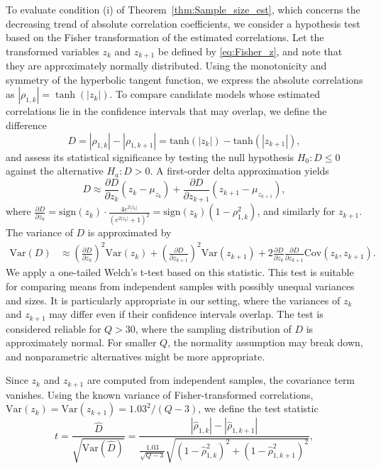 To evaluate condition (i) of Theorem~\ref{thm:Sample_size_est}, which concerns the decreasing trend of absolute correlation coefficients, we consider a hypothesis test based on the Fisher transformation of the estimated correlations. Let the transformed variables $z_k$ and $z_{k+1}$ be defined by \eqref{eq:Fisher_z}, and note that they are approximately normally distributed. Using the monotonicity and symmetry of the hyperbolic tangent function, we express the absolute correlations as $|\rho_{1,k}| = \tanh(|z_k|)$. To compare candidate models whose estimated correlations lie in the confidence intervals that may overlap, we define the difference
%
\[
D = |\rho_{1,k}|-|\rho_{1,k+1}|=\text{tanh}(|z_k|)-\text{tanh}(|z_{k+1}|),
\]
%
and assess its statistical significance by testing the null hypothesis $H_0: D \le 0$ against the alternative $H_a: D > 0$. A first-order delta approximation yields
%
\[
D\approx\frac{\partial D}{\partial z_k}( z_k-\mu_{z_k})+\frac{\partial  D}{\partial z_{k+1}}(z_{k+1}-\mu_{z_{k+1}}),
\]
%
where $\frac{\partial D}{\partial z_k} = \text{sign}(z_k)\cdot \frac{4e^{2|z_k|}}{(e^{2|z_k|}+1)^2} = \text{sign}(z_k)(1-\rho_{1,k}^2)$, and similarly for $z_{k+1}$. The variance of $D$ is approximated by
%
\begin{align*}
    \text{Var}(D) &\approx \left(\frac{\partial D}{\partial z_k}\right)^2 \text{Var}(z_k)+\left(\frac{\partial D}{\partial z_{k+1}}\right)^2 \text{Var}(z_{k+1})+2 \frac{\partial D}{\partial z_k} \frac{\partial D}{\partial  z_{k+1}}\text{Cov}(z_k, z_{k+1}).
\end{align*}
%
We apply a one-tailed Welch’s t-test based on this statistic. This test is suitable for comparing means from independent samples with possibly unequal variances and sizes. It is particularly appropriate in our setting, where the variances of $z_k$ and $z_{k+1}$ may differ even if their confidence intervals overlap. The test is considered reliable for $Q > 30$, where the sampling distribution of $D$ is approximately normal. For smaller $Q$, the normality assumption may break down, and nonparametric alternatives might be more appropriate. 


Since $z_k$ and $z_{k+1}$ are computed from independent samples, the covariance term vanishes.
Using the known variance of Fisher-transformed correlations, $\text{Var}(z_k) = \text{Var}(z_{k+1}) = 1.03^2 / (Q - 3)$, we define the test statistic
%
\begin{equation}\label{eq:Conidtion_1_t_test}
    t = \frac{\widehat D}{\sqrt{\text{Var}(\widehat D)}}=\frac{|\widehat \rho_{1,k}|-|\widehat \rho_{1,k+1}|}{\frac{1.03}{\sqrt{Q-3}}\sqrt{\left(1-\widehat \rho_{1,k}^2\right)^2 +\left(1-\widehat \rho_{1,k+1}^2\right)^2}}, 
\end{equation}


